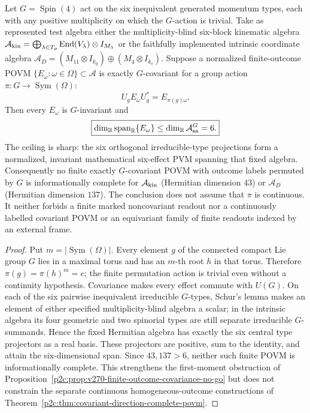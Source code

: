 \documentclass[12pt,a4paper]{article}
\begin{document}
\begin{theorem}
\label{p2c:thm:v299-finite-covariant-six-ceiling}
Let $G=\operatorname{Spin}(4)$ act on the six inequivalent generated
momentum types, each with any positive multiplicity on which the
$G$-action is trivial. Take as represented test algebra either the
multiplicity-blind six-block kinematic algebra
$\mathcal A_{\rm kin}=\bigoplus_{\lambda\in T_p}
 \operatorname{End}(V_\lambda)\otimes I_{M_\lambda}$ or the
faithfully implemented intrinsic coordinate algebra
$\mathcal A_D=(M_{11}\otimes I_{k_g})\oplus(M_4\otimes I_{k_s})$.
Suppose a normalized finite-outcome POVM
$\{E_\omega:\omega\in\Omega\}\subset\mathcal A$ is exactly
$G$-covariant for a group action $\pi:G\to\operatorname{Sym}(\Omega)$:
\[
 U_gE_\omega U_g^*=E_{\pi(g)\omega}.
\]
Then every $E_\omega$ is $G$-invariant and
\[
\boxed{\dim_{\mathbb R}\operatorname{span}_{\mathbb R}
 \{E_\omega\}\leq\dim_{\mathbb R}\mathcal A_{\rm sa}^{G}=6.}
\]
The ceiling is sharp: the six orthogonal irreducible-type projections
form a normalized, invariant mathematical six-effect PVM spanning that
fixed algebra. Consequently no finite exactly $G$-covariant POVM
with outcome labels permuted by $G$ is informationally complete for
$\mathcal A_{\rm kin}$ (Hermitian dimension $43$) or $\mathcal A_D$
(Hermitian dimension $137$). The conclusion does not assume that
$\pi$ is continuous. It neither forbids a finite marked
noncovariant readout nor a continuously labelled covariant POVM or
an equivariant family of finite readouts indexed by an external frame.
\end{theorem}
\begin{proof}
Put $m=|\operatorname{Sym}(\Omega)|$. Every element $g$ of the
connected compact Lie group $G$ lies in a maximal torus and has an
$m$-th root $h$ in that torus. Therefore
$\pi(g)=\pi(h)^m=e$; the finite permutation action is trivial even
without a continuity hypothesis. Covariance makes every effect
commute with $U(G)$. On each of the six pairwise inequivalent
irreducible $G$-types, Schur's lemma makes an element of either
specified multiplicity-blind algebra a scalar; in the intrinsic
algebra its four geometric and two spinorial types are still
separate irreducible $G$-summands. Hence the fixed Hermitian algebra
has exactly the six central type projectors as a real basis.
These projectors are positive, sum to the identity, and attain the
six-dimensional span. Since $43,137>6$, neither such finite POVM is
informationally complete. This strengthens the first-moment
obstruction of Proposition~\ref{p2c:prop:v270-finite-outcome-covariance-no-go}
but does not constrain the separate continuous homogeneous-outcome
constructions of Theorem~\ref{p2c:thm:covariant-direction-complete-povm}.
\end{proof}
\end{document}
